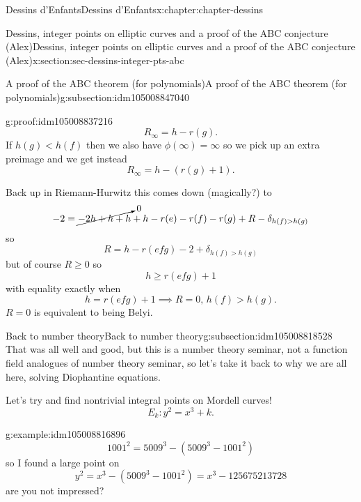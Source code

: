\documentclass[oneside,10pt,]{book}
\numberwithin{equation}{section}
\newcommand{\lt}{<}
\newcommand{\gt}{>}
\begin{document}
\begin{chapterptx}{Dessins d'Enfants}{}{Dessins d'Enfants}{}{}{x:chapter:chapter-dessins}
\begin{sectionptx}{Dessins, integer points on elliptic curves and a proof of the ABC conjecture (Alex)}{}{Dessins, integer points on elliptic curves and a proof of the ABC conjecture (Alex)}{}{}{x:section:sec-dessins-integer-pts-abc}
\begin{subsectionptx}{A proof of the ABC theorem (for polynomials)}{}{A proof of the ABC theorem (for polynomials)}{}{}{g:subsection:idm105008847040}
\begin{proofptx}{}{g:proof:idm105008837216}
\begin{equation*}
R_\infty = h - r(g)\text{.}
\end{equation*}
If \(h(g) \lt h(f)\) then we also have \(\phi(\infty) = \infty\) so we pick up an extra preimage and we get instead%
\begin{equation*}
R_\infty = h - (r(g) + 1)\text{.}
\end{equation*}
%
\par
Back up in Riemann-Hurwitz this comes down (magically?) to%
\begin{equation*}
-2 = \cancelto{0}{-2 h + h + h} + h - r(e) -r(f) - r(g) + R - \delta_{h(f) \gt h(g)}
\end{equation*}
so%
\begin{equation*}
R = h - r(efg) - 2 + \delta_{h(f) \gt h(g)}
\end{equation*}
but of course \(R \ge 0\) so%
\begin{equation*}
h \ge r(efg) + 1
\end{equation*}
with equality exactly when%
\begin{equation*}
h = r(efg) + 1 \implies R = 0,\, h(f) \gt h(g)\text{.}
\end{equation*}
\(R= 0\) is equivalent to being Belyi.%
\end{proofptx}
\end{subsectionptx}
%
%
\typeout{************************************************}
\typeout{************************************************}
%
\begin{subsectionptx}{Back to number theory}{}{Back to number theory}{}{}{g:subsection:idm105008818528}
That was all well and good, but this is a number theory seminar, not a function field analogues of number theory seminar, so let's take it back to why we are all here, solving Diophantine equations.%
\par
Let's try and find nontrivial integral points on Mordell curves!%
\begin{equation*}
E_k\colon y^2 = x^3 + k\text{.}
\end{equation*}
%
\begin{example}{}{g:example:idm105008816896}%
%
\begin{equation*}
1001^2 = 5009^3 - (5009^3 - 1001^2)
\end{equation*}
so I found a large point on%
\begin{equation*}
y^2 = x^3 - (5009^3 - 1001^2) = x^3 - 125675213728
\end{equation*}
are you not impressed?%
\end{example}

\end{subsectionptx}
\end{sectionptx}
\end{chapterptx}
\end{document}
